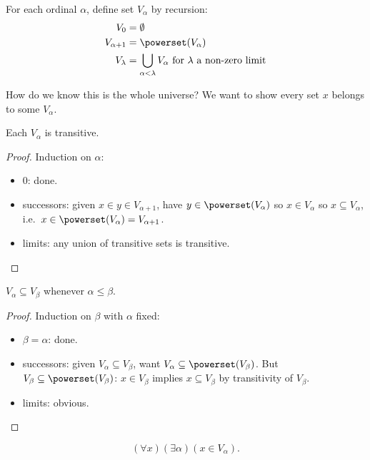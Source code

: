 \documentclass[a4paper]{article}
\begin{document}
\begin{definition}
  For each ordinal \(\alpha\), define set \(V_\alpha\) by recursion:
  \begin{align*}
    V_0 &= \emptyset \\
    V_{\alpha + 1} &= \powerset(V_\alpha) \\
    V_\lambda &= \bigcup_{\alpha < \lambda} V_\alpha \text{ for \(\lambda\) a non-zero limit}
  \end{align*}
\end{definition}

How do we know this is the whole universe? We want to show every set \(x\) belongs to some \(V_\alpha\).

\begin{lemma}
  Each \(V_\alpha\) is transitive.
\end{lemma}

\begin{proof}
  Induction on \(\alpha\):
  \begin{itemize}
  \item \(0\): done.
  \item successors: given \(x \in y \in V_{\alpha + 1}\), have \(y \in \powerset(V_\alpha)\) so \(x \in V_\alpha\) so \(x \subseteq V_\alpha\), i.e.\ \(x \in \powerset(V_\alpha) = V_{\alpha + 1}\).
  \item limits: any union of transitive sets is transitive.
  \end{itemize}
\end{proof}

\begin{lemma}
  \(V_\alpha \subseteq V_\beta\) whenever \(\alpha \leq \beta\).
\end{lemma}

\begin{proof}
  Induction on \(\beta\) with \(\alpha\) fixed:
  \begin{itemize}
  \item \(\beta = \alpha\): done.
  \item successors: given \(V_\alpha \subseteq V_\beta\), want \(V_\alpha \subseteq \powerset(V_\beta)\). But \(V_\beta \subseteq \powerset(V_\beta)\): \(x \in V_\beta\) implies \(x \subseteq V_\beta\) by transitivity of \(V_\beta\).
  \item limits: obvious.
  \end{itemize}
\end{proof}

\begin{theorem}
  \[
    (\forall x) (\exists \alpha) (x \in V_\alpha).
  \]
\end{theorem}
\end{document}

